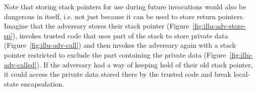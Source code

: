 \documentclass[format=acmsmall, review=true, screen=true]{acmart}
\renewcommand{\figurename}{Figure}
\newcommand\lau[1]{{\color{purple} \sf \footnotesize {LS: #1}}\\}
\renewcommand\lau[1]{}
\begin{document}
Note that storing stack pointers for use during future invocations would also be
dangerous in itself, i.e. not just because it can be used to store return
pointers. Imagine that the adversary stores their stack pointer
(\figurename~\ref{fig:illu-adv-store-sp}), invokes trusted code
that uses part of the stack to store private data
(\figurename~\ref{fig:illu-adv-call}) and then invokes the adversary
again with a stack pointer restricted to exclude the part containing the private
data (\figurename~\ref{fig:illu-adv-called}). If the adversary had a way of keeping hold of their old stack pointer, it
could access the private data stored there by the trusted code and break
local-state encapsulation.  
\end{document}
